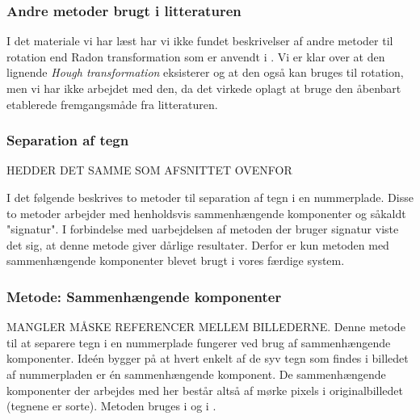 \subsubsection*{Andre metoder brugt i litteraturen}
I det materiale vi har læst har vi ikke fundet beskrivelser af andre metoder til rotation end Radon transformation som er anvendt i \cite{sharpiro}. Vi er klar over at den lignende \textit{Hough transformation} eksisterer og at den også kan bruges til rotation, men vi har ikke arbejdet med den, da det virkede oplagt at bruge den åbenbart etablerede fremgangsmåde fra litteraturen. 

\subsubsection{Separation af tegn}

HEDDER DET SAMME SOM AFSNITTET OVENFOR




I det følgende beskrives to metoder til separation af tegn i en nummerplade. Disse to metoder arbejder med henholdsvis sammenhængende komponenter og såkaldt "signatur". I forbindelse med uarbejdelsen af metoden der bruger signatur viste det sig, at denne metode giver dårlige resultater. Derfor er kun metoden med sammenhængende komponenter blevet brugt i vores færdige system.


\subsubsection*{Metode: Sammenhængende komponenter}

MANGLER MÅSKE REFERENCER MELLEM BILLEDERNE.
Denne metode til at separere tegn i en nummerplade fungerer ved brug af sammenhængende komponenter. Ideén bygger på at hvert enkelt af de syv tegn som findes i billedet af nummerpladen er én sammenhængende komponent. De sammenhængende komponenter der arbejdes med her består altså af mørke pixels i originalbilledet (tegnene er sorte). Metoden bruges i \cite{nijhuis} og i \cite{kwas}.

